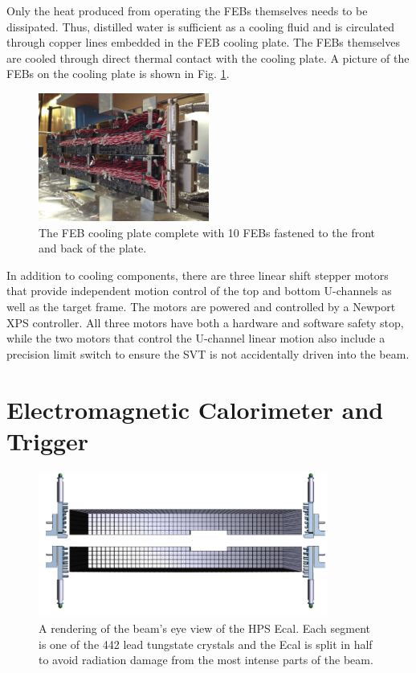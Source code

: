 Only the heat produced from operating the FEBs themselves needs to be dissipated. Thus, distilled water is sufficient as a cooling fluid and is circulated through copper lines embedded in the FEB cooling plate. The FEBs themselves are cooled through direct thermal contact with the cooling plate. A picture of the FEBs on the cooling plate is shown in Fig. \ref{fig:FEBcooling}.

\begin{figure}
    \centering
    \includegraphics[width=0.5\textwidth]{figs/detector/FEBcooling.png}
    \caption{The FEB cooling plate complete with 10 FEBs fastened to the front and back of the plate.}
    \label{fig:FEBcooling}
\end{figure}

In addition to cooling components, there are three linear shift stepper motors that provide independent motion control of the top and bottom U-channels as well as the target frame. The motors are powered and controlled by a Newport XPS controller. All three motors have both a hardware and software safety stop, while the two motors that control the U-channel linear motion also include a precision limit switch to ensure the SVT is not accidentally driven into the beam.

\clearpage

\section{Electromagnetic Calorimeter and Trigger}\label{sec:ecal}

\begin{figure}
    \centering
    \includegraphics[width=0.85\textwidth]{figs/detector/ecal.png}
    \caption{A rendering of the beam's eye view of the HPS Ecal. Each segment is one of the 442 lead tungstate crystals and the Ecal is split in half to avoid radiation damage from the most intense parts of the beam.}
    \label{fig:ecal}
\end{figure}

